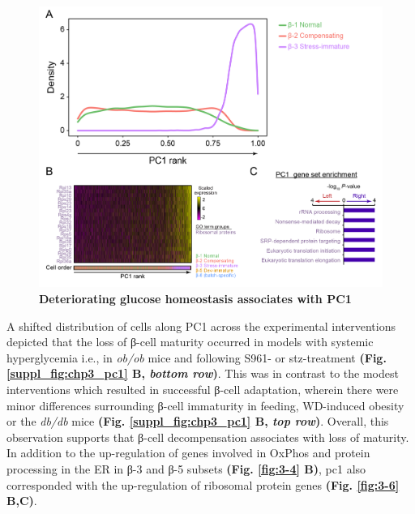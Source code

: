 \begin{figure}[H]
\centering
\includegraphics[width=\linewidth]{Chapter5/Fig/F3-6-02}
\caption[Deteriorating glucose homeostasis associates with PC1]{\textbf{Deteriorating glucose homeostasis associates with PC1}\\}
\label{fig:chp3_pc1}
\end{figure}


A shifted distribution of cells along PC1 across the experimental interventions depicted that the loss of β-cell maturity occurred in models with systemic hyperglycemia i.e., in \textit{ob/ob} mice and following S961- or \gls{stz}-treatment \textbf{(Fig. \ref{suppl_fig:chp3_pc1} B, \textit{bottom row})}. This was in contrast to the modest interventions which resulted in successful β-cell adaptation, wherein there were minor differences surrounding β-cell immaturity in feeding, WD-induced obesity or the \textit{db/db} mice \textbf{(Fig. \ref{suppl_fig:chp3_pc1} B, \textit{top row})}. Overall, this observation supports that β-cell decompensation associates with loss of maturity. In addition to the up-regulation of genes involved in OxPhos and protein processing in the ER in β-3 and β-5 subsets \textbf{(Fig. \ref{fig:3-4} B)}, \gls{pc}1 also corresponded with the up-regulation of ribosomal protein genes \textbf{(Fig. \ref{fig:3-6} B,C)}.\\ %



